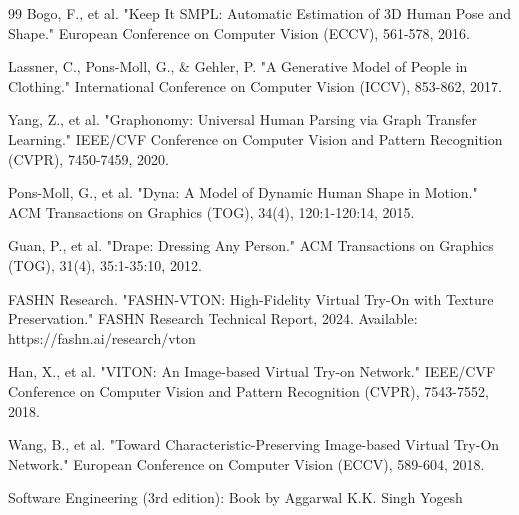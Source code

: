 \documentclass[12pt,a4paper,oneside]{report}
\begin{document}
\begin{thebibliography}{99}
 Bogo, F., et al. "Keep It SMPL: Automatic Estimation of 3D Human Pose and Shape." European Conference on Computer Vision (ECCV), 561-578, 2016.

 Lassner, C., Pons-Moll, G., \& Gehler, P. "A Generative Model of People in Clothing." International Conference on Computer Vision (ICCV), 853-862, 2017.

 Yang, Z., et al. "Graphonomy: Universal Human Parsing via Graph Transfer Learning." IEEE/CVF Conference on Computer Vision and Pattern Recognition (CVPR), 7450-7459, 2020.

 Pons-Moll, G., et al. "Dyna: A Model of Dynamic Human Shape in Motion." ACM Transactions on Graphics (TOG), 34(4), 120:1-120:14, 2015.

 Guan, P., et al. "Drape: Dressing Any Person." ACM Transactions on Graphics (TOG), 31(4), 35:1-35:10, 2012.

 FASHN Research. "FASHN-VTON: High-Fidelity Virtual Try-On with Texture Preservation." FASHN Research Technical Report, 2024. Available: https://fashn.ai/research/vton

 Han, X., et al. "VITON: An Image-based Virtual Try-on Network." IEEE/CVF Conference on Computer Vision and Pattern Recognition (CVPR), 7543-7552, 2018.

 Wang, B., et al. "Toward Characteristic-Preserving Image-based Virtual Try-On Network." European Conference on Computer Vision (ECCV), 589-604, 2018.

 Software Engineering (3rd edition): Book by Aggarwal K.K. Singh Yogesh


\end{thebibliography}
\end{document}
